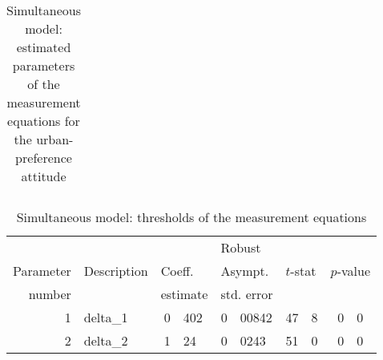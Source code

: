 \documentclass[12pt,a4paper]{article}
\begin{document}
\begin{table}[htb]
\begin{center}
\begin{tabular}{rlr@{.}lr@{.}lr@{.}lr@{.}l}
\end{tabular}
  \caption{Simultaneous model: estimated parameters of the measurement equations for the urban-preference attitude\label{tab:simulataneous_params_urban_meas}}
  \end{center}
\end{table}

\begin{table}[htb]
    \footnotesize
  \begin{center}
\begin{tabular}{rlr@{.}lr@{.}lr@{.}lr@{.}l}
  &              &   \multicolumn{2}{l}{}         & \multicolumn{2}{l}{Robust}  &  \multicolumn{4}{l}{}  \\
  Parameter & Description & \multicolumn{2}{l}{Coeff.} & \multicolumn{2}{l}{Asympt.} & \multicolumn{2}{l}{$t$-stat} & \multicolumn{2}{l}{$p$-value} \\
  number    &             & \multicolumn{2}{l}{estimate} & \multicolumn{2}{l}{std. error} & \multicolumn{2}{l}{} & \multicolumn{2}{l}{} \\
  \hline
1 & delta\_1 & 0&402 & 0&00842 & 47&8 & 0&0 \\ 
2 & delta\_2 & 1&24 & 0&0243 & 51&0 & 0&0 \\ 
\end{tabular}
  \caption{Simultaneous model: thresholds of the measurement equations\label{tab:simultaneous_thresholds}}
  \end{center}
\end{table}
\end{document}
